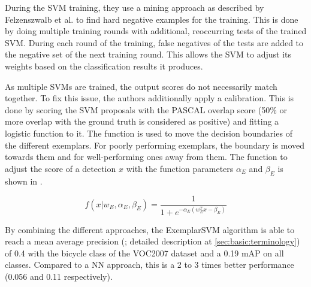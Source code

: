 During the \ac{SVM} training, they use a mining approach as described by Felzenszwalb et al. \cite{felzenszwalb2010object} to find hard negative examples for the training. This is done by doing multiple training rounds with additional, reoccurring tests of the trained \ac{SVM}. During each round of the training, false negatives of the tests are added to the negative set of the next training round. This allows the \ac{SVM} to adjust its weights based on the classification results it produces.

As multiple \acp{SVM} are trained, the output scores do not necessarily match together. To fix this issue, the authors additionally apply a calibration. This is done by scoring the \ac{SVM} proposals with the PASCAL overlap score (50\% or more overlap with the ground truth is considered as positive) and fitting a logistic function to it. The function is used to move the decision boundaries of the different exemplars. For poorly performing exemplars, the boundary is moved towards them and for well-performing ones away from them. The function to adjust the score of a detection $x$ with the function parameters $\alpha_E$ and $\beta_E$ is shown in .

\begin{equation}
f(x|w_E, \alpha_E, \beta_E) = \frac{1}{1 + e^{-\alpha_E (w^T_E x - \beta_E)} }
\label{eqn:esvm:calibration}
\end{equation}

By combining the different approaches, the ExemplarSVM algorithm is able to reach a mean average precision (; detailed description at \ref{sec:basic:terminology}) of 0.4 with the bicycle class of the \ac{VOC2007} dataset \cite{Pascal2007} and a 0.19 \ac{mAP} on all classes. Compared to a \ac{NN} approach, this is a 2 to 3 times better performance (0.056 and 0.11 respectively).